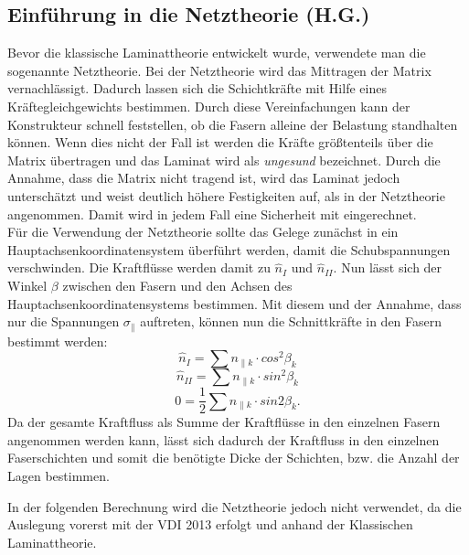 \FloatBarrier
\newpage


\subsection{Einführung in die Netztheorie (H.G.)}
Bevor die klassische Laminattheorie entwickelt wurde, verwendete man die sogenannte Netztheorie. 
Bei der Netztheorie wird das Mittragen der Matrix vernachlässigt. Dadurch lassen sich die Schichtkräfte mit Hilfe eines Kräftegleichgewichts bestimmen. 
Durch diese Vereinfachungen kann der Konstrukteur schnell feststellen, ob die Fasern alleine der Belastung standhalten können. Wenn dies nicht der Fall ist werden die Kräfte größtenteils über die Matrix übertragen und das Laminat wird als \textit{ungesund} bezeichnet. Durch die Annahme, dass die Matrix nicht tragend ist, wird das Laminat jedoch unterschätzt und weist deutlich höhere Festigkeiten auf, als in der Netztheorie angenommen. Damit wird in jedem Fall eine Sicherheit mit eingerechnet.\\
Für die Verwendung der Netztheorie sollte das Gelege zunächst in ein Hauptachsenkoordinatensystem überführt werden, damit die Schubspannungen verschwinden. Die Kraftflüsse werden damit zu $\hat{n}_{I}$ und $\hat{n}_{II}$. Nun lässt sich der Winkel $\beta $ zwischen den Fasern und den Achsen des Hauptachsenkoordinatensystems bestimmen. Mit diesem und der Annahme, dass nur die Spannungen $\sigma_{\|}$ auftreten, können nun die Schnittkräfte in den Fasern bestimmt werden:
\begin{equation}
\hat{n}_{I}=\sum n_{\|k}\cdot cos^2\beta_{k}
\end{equation}
\begin{equation}
\hat{n}_{II}=\sum n_{\|k}\cdot sin^2\beta_{k}
\end{equation}
\begin{equation}
0=\frac{1}{2}\sum n_{\|k}\cdot sin2\beta_{k}.
\end{equation}
Da der gesamte Kraftfluss als Summe der Kraftflüsse in den einzelnen Fasern angenommen werden kann, lässt sich dadurch der Kraftfluss in den einzelnen Faserschichten und somit die benötigte Dicke der Schichten, bzw. die Anzahl der Lagen bestimmen\cite{item3}.

\noindent In der folgenden Berechnung wird die Netztheorie jedoch nicht verwendet, da die Auslegung vorerst mit der VDI 2013 erfolgt und anhand der Klassischen Laminattheorie.
\newpage
